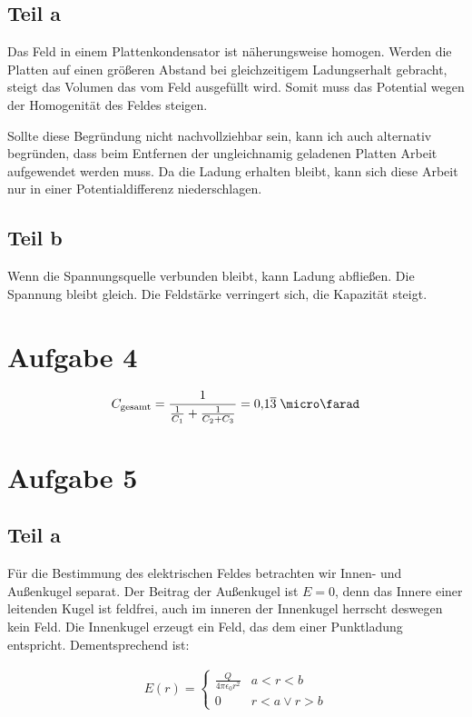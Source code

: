 \documentclass[a4paper,german,12pt,smallheadings]{scrartcl}
\begin{document}
\subsection*{Teil a}
Das Feld in einem Plattenkondensator ist näherungsweise homogen. Werden die
Platten auf einen größeren Abstand bei gleichzeitigem Ladungserhalt gebracht,
steigt das Volumen das vom Feld ausgefüllt wird. Somit muss das Potential wegen
der Homogenität des Feldes steigen.

Sollte diese Begründung nicht nachvollziehbar sein, kann ich auch alternativ
begründen, dass beim Entfernen der ungleichnamig geladenen Platten Arbeit
aufgewendet werden muss. Da die Ladung erhalten bleibt, kann sich diese Arbeit
nur in einer Potentialdifferenz niederschlagen.

\subsection*{Teil b}
Wenn die Spannungsquelle verbunden bleibt, kann Ladung abfließen. Die Spannung
bleibt gleich. Die Feldstärke verringert sich, die Kapazität steigt.


\section*{Aufgabe 4}

\begin{align*}
  C_{\operatorname{gesamt}} = \frac{1}{\frac{1}{C_1} + \frac{1}{C_2 + C_3}} = 0{,}1\overline{3} \;\micro\farad
\end{align*}

\section*{Aufgabe 5}
\subsection*{Teil a}
Für die Bestimmung des elektrischen Feldes betrachten wir Innen- und Außenkugel
separat. Der Beitrag der Außenkugel ist $E=0$, denn das Innere einer leitenden
Kugel ist feldfrei, auch im inneren der Innenkugel herrscht deswegen kein Feld.
Die Innenkugel erzeugt ein Feld, das dem einer Punktladung entspricht.
Dementsprechend ist:

\begin{align*}
  E(r) = \left\{\begin{array}{ll} \frac{Q}{4 \pi \epsilon_0 r^2} & a < r < b \\
         0 & r < a \lor r > b\end{array}\right.
\end{align*}
\end{document}
